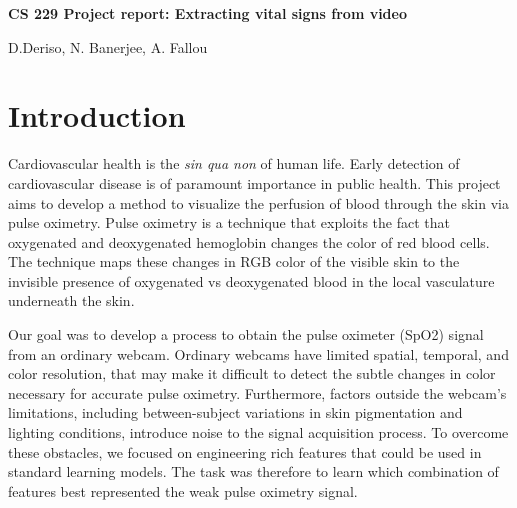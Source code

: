 \documentclass[12pt]{article}
\begin{document}
 \centerline{\Large \bf CS 229 Project report: Extracting vital signs from video} %

 \medskip

 \centerline{D.Deriso, N. Banerjee, A. Fallou}
 \bigskip
\thispagestyle{plain}
\begin{abstract}
In both developing and developed countries, reducing the cost of medical care is a primary goal of science and government. In this project we seek to find and extract information from a video of a human that tells us the pulse rate and the oxygen level of the blood, with the eventual aim to create a virtual pulse oximeter. Features to be extracted were chosen to be related to the three color channel intensity values, with the idea that changing color of the video would relate to blood flow around the body. Extensive pre-processing was required on both the video data and the pulse oximeter data to enable training. Early results showed that feature selection was vital in reducing the mean-squared error of the output. At the end of this report, we outline further work to be done.

\end{abstract}


\section{Introduction}
%
\small  

Cardiovascular health is the \emph{sin qua non} of human life. Early detection of cardiovascular disease is of paramount importance in public health. This project aims to develop a method to visualize the perfusion of blood through the skin via pulse oximetry. Pulse oximetry is a technique that exploits the fact that oxygenated and deoxygenated hemoglobin changes the color of red blood cells. The technique maps these changes in RGB color of the visible skin to the invisible presence of oxygenated vs deoxygenated blood in the local vasculature underneath the skin.

Our goal was to develop a process to obtain the pulse oximeter (SpO2) signal from an ordinary webcam. Ordinary webcams have limited spatial, temporal, and color resolution, that may make it difficult to detect the subtle changes in color necessary for accurate pulse oximetry. Furthermore, factors outside the webcam’s limitations, including between-subject variations in skin pigmentation and lighting conditions, introduce noise to the signal acquisition process. To overcome these obstacles, we focused on engineering rich features that could be used in standard learning models. The task was therefore to learn which combination of features best represented the weak pulse oximetry signal.
\end{document}
